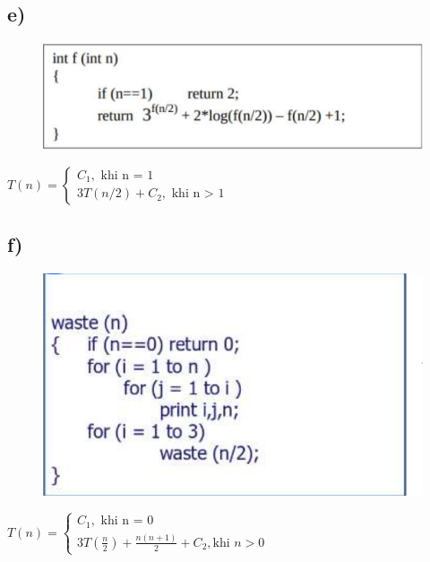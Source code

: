 \documentclass[10pt,a4paper]{article}
\begin{document}
\subsection*{e)}
\begin{figure}[H]
    \centering
    \includegraphics[scale=.6]{images/1e.png}
    \label{fig:my_label}
\end{figure}
$
T(n) = 
    \begin{cases}
        C_1, \text{ khi n = 1} \\
        3T(n/2) + C_2, \text{ khi n > 1}
    \end{cases}
$
\subsection*{f)}
\begin{figure}[H]
    \centering
    \includegraphics[scale=.7]{images/1f.png}
    \label{fig:my_label}
\end{figure}
$
T(n) = 
    \begin{cases}
        C_1, \text{ khi n = 0} \\
        3T(\frac{n}{2}) + \frac{n(n+1)}{2} + C_2, \text{khi $n>0$}
    \end{cases}
$
\end{document}
